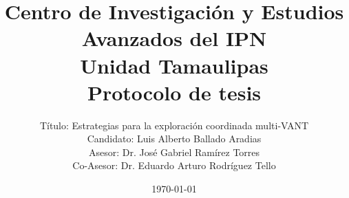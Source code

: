 \documentclass[11pt,epsf,times]{article}
\title{ Centro de Investigaci\'{o}n y Estudios Avanzados del IPN\\
  Unidad Tamaulipas\\
  \textbf{Protocolo de tesis}
}
\author{
T\'{i}tulo: Estrategias para la exploraci\'{o}n coordinada multi-VANT \\
Candidato: Luis Alberto Ballado Aradias \\
Asesor: Dr. Jos\'{e} Gabriel Ram\'{i}rez Torres \\
Co-Asesor: Dr. Eduardo Arturo Rodr\'{i}guez Tello
}
\date{\today}
\begin{document}
\maketitle
\begin{abstract}

  




\end{abstract}
\end{document}
